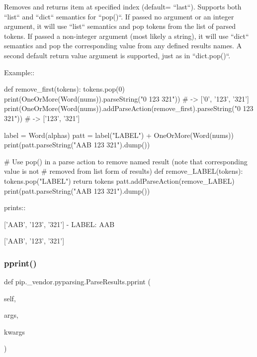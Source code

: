 \begin{DoxyVerb}Removes and returns item at specified index (default= ``last``).
Supports both ``list`` and ``dict`` semantics for ``pop()``. If
passed no argument or an integer argument, it will use ``list``
semantics and pop tokens from the list of parsed tokens. If passed
a non-integer argument (most likely a string), it will use ``dict``
semantics and pop the corresponding value from any defined results
names. A second default return value argument is supported, just as in
``dict.pop()``.

Example::

    def remove_first(tokens):
tokens.pop(0)
    print(OneOrMore(Word(nums)).parseString("0 123 321")) # -> ['0', '123', '321']
    print(OneOrMore(Word(nums)).addParseAction(remove_first).parseString("0 123 321")) # -> ['123', '321']

    label = Word(alphas)
    patt = label("LABEL") + OneOrMore(Word(nums))
    print(patt.parseString("AAB 123 321").dump())

    # Use pop() in a parse action to remove named result (note that corresponding value is not
    # removed from list form of results)
    def remove_LABEL(tokens):
tokens.pop("LABEL")
return tokens
    patt.addParseAction(remove_LABEL)
    print(patt.parseString("AAB 123 321").dump())

prints::

    ['AAB', '123', '321']
    - LABEL: AAB

    ['AAB', '123', '321']
\end{DoxyVerb}
 \mbox{\label{classpip_1_1__vendor_1_1pyparsing_1_1ParseResults_a60c51a7afb4963efb8671eef18fb66bb}} 
\subsubsection{\texorpdfstring{pprint()}{pprint()}}
{\footnotesize\ttfamily def pip.\+\_\+vendor.\+pyparsing.\+Parse\+Results.\+pprint (\begin{DoxyParamCaption}\item[{}]{self,  }\item[{}]{args,  }\item[{}]{kwargs }\end{DoxyParamCaption})}

